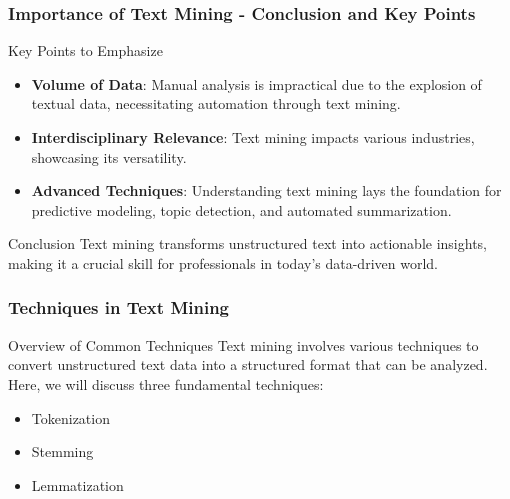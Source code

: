 \documentclass[aspectratio=169]{beamer}
\begin{document}
\begin{frame}[fragile]
    \frametitle{Importance of Text Mining - Conclusion and Key Points}
    \begin{block}{Key Points to Emphasize}
        \begin{itemize}
            \item \textbf{Volume of Data}: Manual analysis is impractical due to the explosion of textual data, necessitating automation through text mining.
            \item \textbf{Interdisciplinary Relevance}: Text mining impacts various industries, showcasing its versatility.
            \item \textbf{Advanced Techniques}: Understanding text mining lays the foundation for predictive modeling, topic detection, and automated summarization.
        \end{itemize}
    \end{block}
    
    \begin{block}{Conclusion}
        Text mining transforms unstructured text into actionable insights, making it a crucial skill for professionals in today's data-driven world.
    \end{block}
\end{frame}

\begin{frame}[fragile]
    \frametitle{Techniques in Text Mining}
    \begin{block}{Overview of Common Techniques}
        Text mining involves various techniques to convert unstructured text data into a structured format that can be analyzed. Here, we will discuss three fundamental techniques: 
        \begin{itemize}
            \item Tokenization
            \item Stemming
            \item Lemmatization
        \end{itemize}
    \end{block}
\end{frame}
\end{document}
